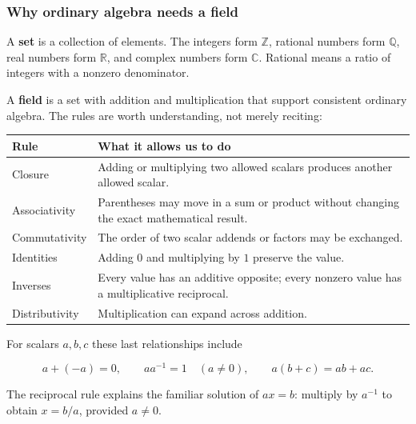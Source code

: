 \subsubsection{Why ordinary algebra needs a field}\label{01-foundations-i-ch017-why-ordinary-algebra-needs-a-field}

A \textbf{set} is a collection of elements. The integers form \(\mathbb Z\), rational numbers form \(\mathbb Q\), real numbers form \(\mathbb R\), and complex numbers form \(\mathbb C\). Rational means a ratio of integers with a nonzero denominator.

A \textbf{field} is a set with addition and multiplication that support consistent ordinary algebra. The rules are worth understanding, not merely reciting:

{\def\LTcaptype{none} %
\begin{longtable}[]{@{}
  >{\raggedright\arraybackslash}p{}
  >{\raggedright\arraybackslash}p{}@{}}
\toprule\noalign{}
\begin{minipage}[b]{\linewidth}\raggedright
Rule
\end{minipage} & \begin{minipage}[b]{\linewidth}\raggedright
What it allows us to do
\end{minipage} \\
\midrule\noalign{}
\endhead
\bottomrule\noalign{}
\endlastfoot
Closure & Adding or multiplying two allowed scalars produces another allowed scalar. \\
Associativity & Parentheses may move in a sum or product without changing the exact mathematical result. \\
Commutativity & The order of two scalar addends or factors may be exchanged. \\
Identities & Adding \(0\) and multiplying by \(1\) preserve the value. \\
Inverses & Every value has an additive opposite; every nonzero value has a multiplicative reciprocal. \\
Distributivity & Multiplication can expand across addition. \\
\end{longtable}
}

For scalars \(a,b,c\) these last relationships include

\[
a+(-a)=0,\qquad aa^{-1}=1\quad(a\ne0),\qquad a(b+c)=ab+ac.
\]

The reciprocal rule explains the familiar solution of \(ax=b\): multiply by \(a^{-1}\) to obtain \(x=b/a\), provided \(a\ne0\).

